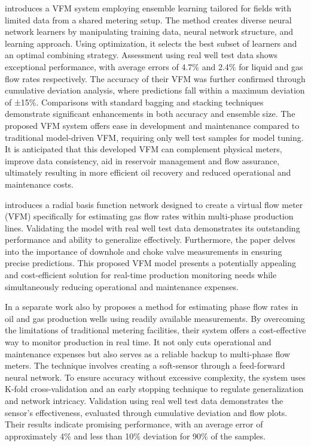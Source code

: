 \documentclass[12pt,APA]{uomthesis}
\begin{document}
\citep{al2018virtual} introduces a VFM system employing ensemble learning tailored for fields with limited data from a shared metering setup. The method creates diverse neural network learners by manipulating training data, neural network structure, and learning approach. Using  optimization, it selects the best subset of learners and an optimal combining strategy. Assessment using real well test data shows exceptional performance, with average errors of 4.7\% and 2.4\% for liquid and gas flow rates respectively. The accuracy of their VFM was further confirmed through cumulative deviation analysis, where predictions fall within a maximum deviation of ±15\%. Comparisons with standard bagging and stacking techniques demonstrate significant enhancements in both accuracy and ensemble size. The proposed VFM system offers ease in development and maintenance compared to traditional model-driven VFM, requiring only well test samples for model tuning. It is anticipated that this developed VFM can complement physical meters, improve data consistency, aid in reservoir management and flow assurance, ultimately resulting in more efficient oil recovery and reduced operational and maintenance costs.

\citep{al2017radial} introduces a radial basis function network designed to create a virtual flow meter (VFM) specifically for estimating gas flow rates within multi-phase production lines. Validating the model with real well test data demonstrates its outstanding performance and ability to generalize effectively. Furthermore, the paper delves into the importance of downhole and choke valve measurements in ensuring precise predictions. This proposed VFM model presents a potentially appealing and cost-efficient solution for real-time production monitoring needs while simultaneously reducing operational and maintenance expenses.

In a separate work also by \citep{al2017development} proposes a method for estimating phase flow rates in oil and gas production wells using readily available measurements. By overcoming the limitations of traditional metering facilities, their system offers a cost-effective way to monitor production in real time. It not only cuts operational and maintenance expenses but also serves as a reliable backup to multi-phase flow meters. The technique involves creating a soft-sensor through a feed-forward neural network. To ensure accuracy without excessive complexity, the system uses K-fold cross-validation and an early stopping technique to regulate generalization and network intricacy. Validation using real well test data demonstrates the sensor's effectiveness, evaluated through cumulative deviation and flow plots. Their results indicate promising performance, with an average error of approximately 4\% and less than 10\% deviation for 90\% of the samples.
\end{document}
